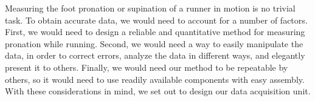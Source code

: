 Measuring the foot pronation or supination of a runner in motion is no trivial task.
To obtain accurate data, we would need to account for a number of factors.
First, we would need to design a reliable and quantitative method for measuring pronation while running.
Second, we would need a way to easily manipulate the data, in order to correct errors, analyze the data in different ways, and elegantly present it to others.
Finally, we would need our method to be repeatable by others, so it would need to use readily available components with easy assembly.
With these considerations in mind, we set out to design our data acquisition unit.\par
